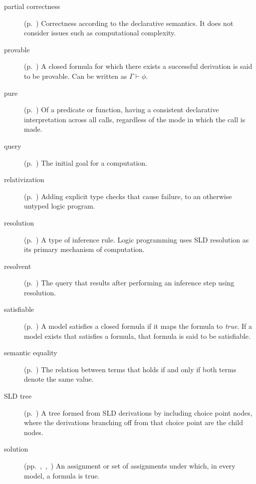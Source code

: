 \begin{description}
\item[partial correctness]
(p.~\pageref{gi:partial-correctness})
Correctness according to the declarative semantics.
It does not consider issues such as computational complexity.

\item[provable]
(p.~\pageref{gi:provable})
A closed formula for which there exists a successful derivation
is said to be provable.
Can be written as $\Gamma \vdash \phi$.

\item[pure]
(p.~\pageref{gi:pure})
Of a predicate or function,
having a consistent declarative interpretation across all calls,
regardless of the mode in which the call is made.

\item[query]
(p.~\pageref{sec:queries})
The initial goal for a computation.

\item[relativization]
(p.~\pageref{gi:relativization})
Adding explicit type checks that cause failure,
to an otherwise untyped logic program.

\item[resolution]
(p.~\pageref{gi:resolution})
A type of inference rule.
Logic programming uses SLD resolution
as its primary mechanism of computation.

\item[resolvent]
(p.~\pageref{gi:resolvent})
The query that results after performing an inference step
using resolution.

\item[satisfiable]
(p.~\pageref{gi:satisfiable})
A model satisfies a closed formula if it maps the formula to \textit{true}.
If a model exists that satisfies a formula,
that formula is said to be satisfiable.

\item[semantic equality]
(p.~\pageref{gi:semantic-equality})
The relation between terms that holds
if and only if both terms denote the same value.

\item[SLD tree]
(p.~\pageref{gi:sld-tree})
A tree formed from SLD derivations by including choice point nodes,
where the derivations branching off from that choice point
are the child nodes.

\item[solution]
(pp.~\pageref{gi:solution},~\pageref{gi:solution2},~\pageref{gi:solution3})
An assignment or set of assignments under which, in every model,
a formula is true.


\end{description}
